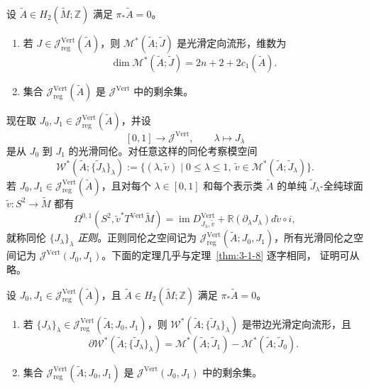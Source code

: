 \begin{theorem}\label{thm:8-4-1}
设 $\widetilde A\in H_2(\widetilde M;\mathbb Z)$ 满足
$\pi_*\widetilde A=0$。
\begin{enumerate}[label=\textup{(\roman*)},leftmargin=3em]
\item 若 $J\in\mathcal J_{\mathrm{reg}}^{\mathrm{Vert}}(\widetilde A)$，则
$\mathcal M^*(\widetilde A;\widetilde J)$ 是光滑定向流形，维数为
\[
  \dim\mathcal M^*(\widetilde A;\widetilde J)
  =2n+2+2c_1(\widetilde A).
\]
\item 集合 $\mathcal J_{\mathrm{reg}}^{\mathrm{Vert}}(\widetilde A)$ 是
$\mathcal J^{\mathrm{Vert}}$ 中的剩余集。
\end{enumerate}
\end{theorem}

现在取
$J_0,J_1\in\mathcal J_{\mathrm{reg}}^{\mathrm{Vert}}(\widetilde A)$，并设
\[
  [0,1]\longrightarrow\mathcal J^{\mathrm{Vert}},
  \qquad\lambda\longmapsto J_\lambda
\]
是从 $J_0$ 到 $J_1$ 的光滑同伦。对任意这样的同伦考察模空间
\[
  \mathcal W^*(\widetilde A;\{\widetilde J_\lambda\}_\lambda)
  :=\bigl\{(\lambda,\widetilde v)\mid0\le\lambda\le1,\
  \widetilde v\in\mathcal M^*(\widetilde A;\widetilde J_\lambda)\bigr\}.
\]
若 $J_0,J_1\in\mathcal J_{\mathrm{reg}}^{\mathrm{Vert}}(\widetilde A)$，且对每个
$\lambda\in[0,1]$ 和每个表示类 $\widetilde A$ 的单纯
$\widetilde J_\lambda$-全纯球面 $\widetilde v:S^2\to\widetilde M$ 都有
\[
  \Omega^{0,1}(S^2,\widetilde v^*T^{\mathrm{Vert}}\widetilde M)
  =\operatorname{im}D^{\mathrm{Vert}}_{J_\lambda,\widetilde v}
   +\mathbb R(\partial_\lambda J_\lambda)d\widetilde v\circ i,
\]
就称同伦 $\{J_\lambda\}_\lambda$ \emph{正则}。正则同伦之空间记为
$\mathcal J_{\mathrm{reg}}^{\mathrm{Vert}}(\widetilde A;J_0,J_1)$，所有光滑同伦之空间记为
$\mathcal J^{\mathrm{Vert}}(J_0,J_1)$。下面的定理几乎与定理~\ref{thm:3-1-8} 逐字相同，
证明可从略。

\begin{theorem}\label{thm:8-4-2}
设 $J_0,J_1\in\mathcal J_{\mathrm{reg}}^{\mathrm{Vert}}(\widetilde A)$，且
$\widetilde A\in H_2(\widetilde M;\mathbb Z)$ 满足 $\pi_*\widetilde A=0$。
\begin{enumerate}[label=\textup{(\roman*)},leftmargin=3em]
\item 若
$\{J_\lambda\}_\lambda\in
\mathcal J_{\mathrm{reg}}^{\mathrm{Vert}}(\widetilde A;J_0,J_1)$，则
$\mathcal W^*(\widetilde A;\{\widetilde J_\lambda\}_\lambda)$ 是带边光滑定向流形，且
\[
  \partial\mathcal W^*(\widetilde A;\{\widetilde J_\lambda\}_\lambda)
  =\mathcal M^*(\widetilde A;\widetilde J_1)
   -\mathcal M^*(\widetilde A;\widetilde J_0).
\]
\item 集合
$\mathcal J_{\mathrm{reg}}^{\mathrm{Vert}}(\widetilde A;J_0,J_1)$ 是
$\mathcal J^{\mathrm{Vert}}(J_0,J_1)$ 中的\BookRecordIndex{T0300}剩余集。
\end{enumerate}
\end{theorem}

